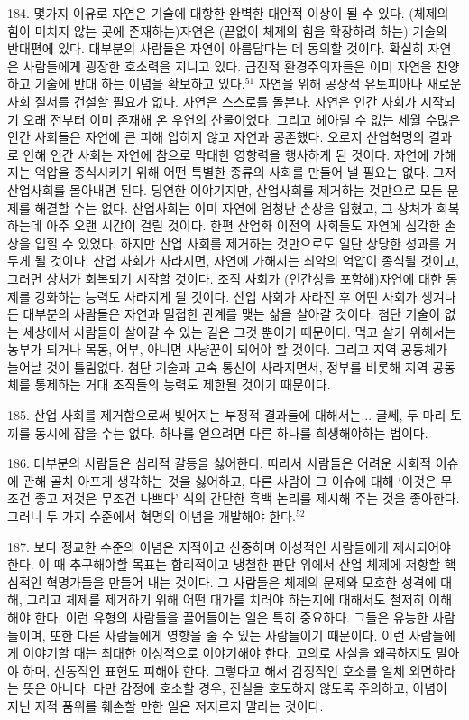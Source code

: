 \documentclass[11pt,a4paper]{article}
\begin{document}
\begin{multicols}{2}
184. 몇가지 이유로 자연은 기술에 대항한 완벽한 대안적 이상이 될 수 있다. (체제의 힘이 미치지 않는  곳에 존재하는)자연은 (끝없이 체제의 힘을 확장하려 하는) 기술의 반대편에 있다. 대부분의 사람들은  자연이 아름답다는 데 동의할 것이다. 확실히 자연은 사람들에게 굉장한 호소력을 지니고 있다. 급진적  환경주의자들은 이미 자연을 찬양하고 기술에 반대 하는 이념을 확보하고 있다.\hyperlink{51}{$^{51}$} 자연을 위해 공상적  유토피아나 새로운 사회 질서를 건설할 필요가 없다. 자연은 스스로를 돌본다. 자연은 인간 사회가  시작되기 오래 전부터 이미 존재해 온 우연의 산물이었다. 그리고 헤아릴 수 없는 세월 수많은 인간  사회들은 자연에 큰 피해 입히지 않고 자연과 공존했다. 오로지 산업혁명의 결과로 인해 인간 사회는  자연에 참으로 막대한 영향력을 행사하게 된 것이다. 자연에 가해지는 억압을 종식시키기 위해 어떤 특별한 종류의 사회를 만들어 낼 필요는 없다. 그저 산업사회를 몰아내면 된다. 딩연한 이야기지만,  산업사회를 제거하는 것만으로 모든 문제를 해결할 수는 없다. 산업사회는 이미 자연에 엄청난 손상을  입혔고, 그 상처가 회복하는데 아주 오랜 시간이 걸릴 것이다. 한편 산업화 이전의 사회들도 자연에  심각한 손상을 입힐 수 있었다. 하지만 산업 사회를 제거하는 것만으로도 일단 상당한 성과를 거두게 될  것이다. 산업 사회가 사라지면, 자연에 가해지는 최악의 억압이 종식될 것이고, 그러면 상처가 회복되기  시작할 것이다. 조직 사회가 (인간성을 포함해)자연에 대한 통제를 강화하는 능력도 사라지게 될 것이다.  산업 사회가 사라진 후 어떤 사회가 생겨나든 대부분의 사람들은 자연과 밀접한 관계를 맺는 삶을 살아갈 것이다. 첨단 기술이 없는 세상에서 사람들이 살아갈 수 있는 길은 그것 뿐이기 때문이다. 먹고 살기  위해서는 농부가 되거나 목동, 어부, 아니면 사냥꾼이 되어야 할 것이다. 그리고 지역 공동체가 늘어날  것이 틀림없다. 첨단 기술과 고속 통신이 사라지면서, 정부를 비롯해 지역 공동체를 통제하는 거대  조직들의 능력도 제한될 것이기 때문이다. 


185. 산업 사회를 제거함으로써 빚어지는 부정적 결과들에 대해서는... 글쎄, 두 마리 토끼를 동시에 잡을 수는 없다. 하나를 얻으려면 다른 하나를 희생해야하는 법이다.  


186. 대부분의 사람들은 심리적 갈등을 싫어한다. 따라서 사람들은 어려운 사회적 이슈에 관해 골치  아프게 생각하는 것을 싫어하고, 다른 사람이 그 이슈에 대해 ‘이것은 무조건 좋고 저것은 무조건 나쁘다’ 식의 간단한 흑백 논리를 제시해 주는 것을 좋아한다. 그러니 두 가지 수준에서 혁명의 이념을 개발해야  한다.\hyperlink{52}{$^{52}$} 


187. 보다 정교한 수준의 이념은 지적이고 신중하며 이성적인 사람들에게 제시되어야 한다. 이 때  추구해야할 목표는 합리적이고 냉철한 판단 위에서 산업 체제에 저항할 핵심적인 혁명가들을 만들어 내는 것이다. 그 사람들은 체제의 문제와 모호한 성격에 대해, 그리고 체제를 제거하기 위해 어떤 대가를  치러야 하는지에 대해서도 철저히 이해해야 한다. 이런 유형의 사람들을 끌어들이는 일은 특히 중요하다.  그들은 유능한 사람들이며, 또한 다른 사람들에게 영향을 줄 수 있는 사람들이기 때문이다. 이런  사람들에게 이야기할 때는 최대한 이성적으로 이야기해야 한다. 고의로 사실을 왜곡하지도 말아야 하며,  선동적인 표현도 피해야 한다. 그렇다고 해서 감정적인 호소를 일체 외면하라는 뜻은 아니다. 다만 감정에 호소할 경우, 진실을 호도하지 않도록 주의하고, 이념이 지닌 지적 품위를 훼손할 만한 일은 저지르지  말라는 것이다.  



\end{multicols}
\end{document}
